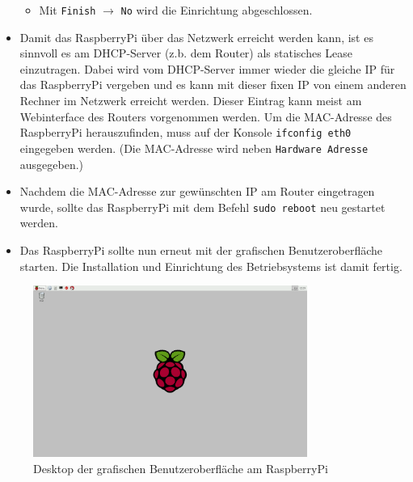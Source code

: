 \begin{itemize}
{\begin{itemize}
		\item {Mit \lstinline|Finish| $\rightarrow$ \lstinline|No| wird die Einrichtung abgeschlossen.}
		\end{itemize}
		}
	\item {Damit das RaspberryPi über das Netzwerk erreicht werden kann, ist es sinnvoll es am DHCP-Server (z.b. dem Router) als statisches Lease \cite{lease} einzutragen.
		Dabei wird vom DHCP-Server immer wieder die gleiche IP für das RaspberryPi vergeben und es kann mit dieser fixen IP von einem anderen Rechner im Netzwerk erreicht werden.
		Dieser Eintrag kann meist am Webinterface des Routers vorgenommen werden.
		Um die MAC-Adresse des RaspberryPi herauszufinden, muss auf der Konsole \lstinline|ifconfig eth0| eingegeben werden.
		(Die MAC-Adresse wird neben \lstinline|Hardware Adresse| ausgegeben.)
		}
	\item {Nachdem die MAC-Adresse zur gewünschten IP am Router eingetragen wurde, sollte das RaspberryPi mit dem Befehl \lstinline|sudo reboot| neu gestartet werden.
		}
	\item {Das RaspberryPi sollte nun erneut mit der grafischen Benutzeroberfläche starten.
		Die Installation und Einrichtung des Betriebsystems ist damit fertig.
		}
\end{itemize}

\begin{figure}[h!]
	\centering
		\includegraphics[width=0.8\textwidth]{./fotos/2015-02-08-222932_1920x1200_scrot.png}
	\caption{Desktop der grafischen Benutzeroberfläche am RaspberryPi}
	\label{fig:rpidesktop}
\end{figure}

